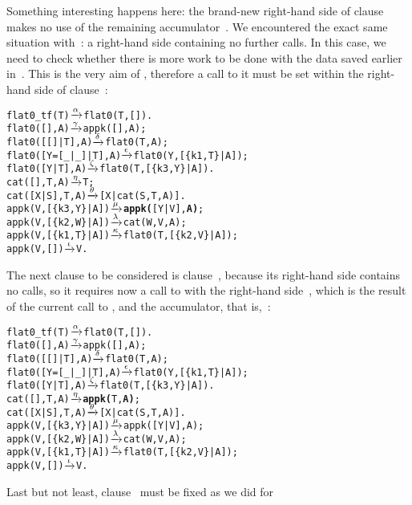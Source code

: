 Something interesting happens here: the brand\hyp{}new right\hyp{}hand
side of clause~\clause{\mu} makes no use of the remaining
accumulator~. We encountered the exact same situation
with~\clause{\gamma}: a right\hyp{}hand side containing no further
calls. In this case, we need to check whether there is more work to be
done with the data saved earlier in~. This is the very aim
of , therefore a call to it must be set within the
right\hyp{}hand side of clause~\clause{\mu}:
\begin{alltt}
flat0\_tf(T)          \(\smashedrightarrow{\alpha}\) flat0(T,[]).
flat0(         [],A) \(\smashedrightarrow{\gamma}\) appk([],A);
flat0(     [[]|T],A) \(\smashedrightarrow{\delta}\) flat0(T,A);
flat0([Y=[\_|\_]|T],A) \(\smashedrightarrow{\epsilon}\) flat0(Y,[\{k1,T\}|A]);
flat0(      [Y|T],A) \(\smashedrightarrow{\zeta}\) flat0(T,[\{k3,Y\}|A]).
cat(   [],T,A)       \(\smashedrightarrow{\eta}\) T;\hfill% A \emph{unused yet}
cat([X|S],T,A)       \(\smashedrightarrow{\theta}\) [X|cat(S,T,A)].
appk(V,[\{k3,Y\}|A])   \(\smashedrightarrow{\mu}\) \textbf{appk(}[Y|V],\textbf{A)};
appk(V,[\{k2,W\}|A])   \(\smashedrightarrow{\lambda}\) cat(W,V,A);
appk(V,[\{k1,T\}|A])   \(\smashedrightarrow{\kappa}\) flat0(T,[\{k2,V\}|A]);
appk(V,        [])   \(\smashedrightarrow{\iota}\) V.
\end{alltt}
The next clause to be considered is clause~\clause{\eta}, because its
right\hyp{}hand side contains no calls, so it requires now a call to
 with the right\hyp{}hand side~, which is
the result of the current call to , and the
accumulator, that is,~:
\begin{alltt}
flat0\_tf(T)          \(\smashedrightarrow{\alpha}\) flat0(T,[]).
flat0(         [],A) \(\smashedrightarrow{\gamma}\) appk([],A);
flat0(     [[]|T],A) \(\smashedrightarrow{\delta}\) flat0(T,A);
flat0([Y=[\_|\_]|T],A) \(\smashedrightarrow{\epsilon}\) flat0(Y,[\{k1,T\}|A]);
flat0(      [Y|T],A) \(\smashedrightarrow{\zeta}\) flat0(T,[\{k3,Y\}|A]).
cat(   [],T,A)       \(\smashedrightarrow{\eta}\) \textbf{appk(}T,\textbf{A)};
cat([X|S],T,A)       \(\smashedrightarrow{\theta}\) [X|cat(S,T,A)].
appk(V,[\{k3,Y\}|A])   \(\smashedrightarrow{\mu}\) appk([Y|V],A);
appk(V,[\{k2,W\}|A])   \(\smashedrightarrow{\lambda}\) cat(W,V,A);
appk(V,[\{k1,T\}|A])   \(\smashedrightarrow{\kappa}\) flat0(T,[\{k2,V\}|A]);
appk(V,        [])   \(\smashedrightarrow{\iota}\) V.
\end{alltt}
Last but not least, clause~\clause{\theta} must be fixed as we did for
